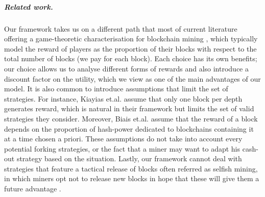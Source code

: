 \documentclass[a4paper,english,cleveref, autoref,numberwithinsect]{lipics-v2019}
\begin{document}


\subparagraph*{Related work.} Our framework takes us on a different path that most of current literature offering a game-theoretic characterisation for blockchain mining \cite{mininggames:2016,biais2018blockchain,koutsoupias2018blockchain}, which typically model the reward of players as the proportion of their blocks with respect to the total number of blocks (we pay for each block). Each choice has its own benefits; our choice allows us to analyse different forms of rewards and also introduce a discount factor on the utility, which we view as one of the main advantages of our model. It is also common to introduce assumptions that limit the set of strategies. For instance, Kiayias et.al. \cite{mininggames:2016} assume that only one block per depth generates reward, which is natural in their framework but limits the set of valid strategies they consider. Moreover, Biais et.al.\cite{biais2018blockchain}  assume that the reward of a block depends on the proportion of hash-power dedicated to blockchains containing it at a time chosen a priori. These assumptions do not take into account every potential forking strategies, or the fact that a miner may want to adapt his cash-out strategy based on the situation. 
Lastly, our framework cannot deal with strategies that feature a tactical release of blocks often referred as selfish mining, in which miners opt not to release new blocks in hope that these will give them a future advantage \cite{optimalselfishmining2017,selfishmining2014,stop_selfish_mining2014,stubborn_mining:2016,stubborn_mining:2015}. 
\end{document}
